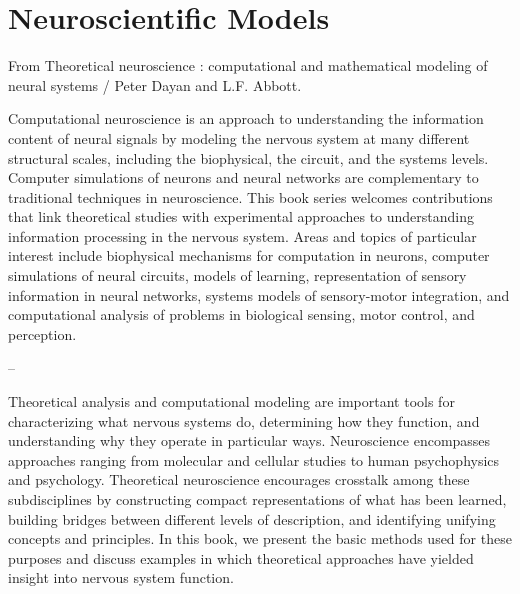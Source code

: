 
\chapter{Neuroscientific Models}\label{chap:compneuro}

From Theoretical neuroscience : computational and mathematical modeling of neural
systems / Peter Dayan and L.F. Abbott.


Computational neuroscience is an approach to understanding the information content of neural signals by modeling the nervous system at many different structural scales, including the biophysical, the circuit, and the systems levels. Computer simulations of neurons and neural networks are complementary to traditional techniques in neuroscience. This book series welcomes contributions that link theoretical studies with experimental approaches to understanding information processing in the nervous system. Areas and topics of particular interest include biophysical mechanisms for computation in neurons, computer simulations of neural circuits, models of learning, representation of sensory information in neural networks, systems models of sensory-motor integration, and computational analysis of problems in biological sensing, motor control, and perception.

--

Theoretical analysis and computational modeling are important tools for characterizing what nervous systems do, determining how they function, and understanding why they operate in particular ways. Neuroscience encompasses approaches ranging from molecular and cellular studies to human psychophysics and psychology. Theoretical neuroscience encourages crosstalk among these subdisciplines by constructing compact representations of what has been learned, building bridges between different levels of description, and identifying unifying concepts and principles. In this book, we present the basic methods used for these purposes and discuss examples in which theoretical approaches have yielded insight into nervous system function.

